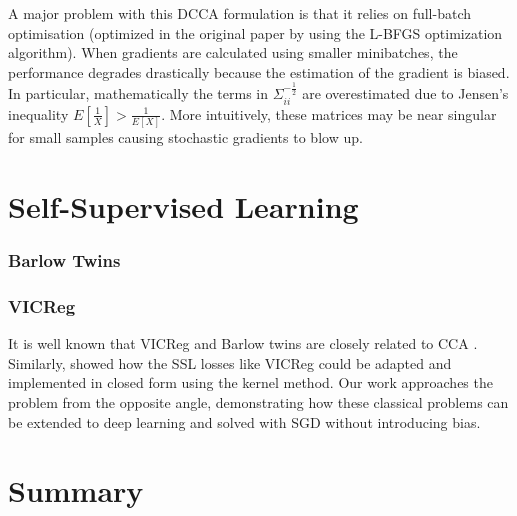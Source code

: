 A major problem with this DCCA formulation is that it relies on full-batch optimisation (optimized in the original paper by using the L-BFGS optimization algorithm). When gradients are calculated using smaller minibatches, the performance degrades drastically  because the estimation of the gradient is biased. In particular, mathematically the terms in $\Sigma_{ii}^{-\frac{1}{2}}$ are overestimated due to Jensen's inequality $E[\frac{1}{X}]>\frac{1}{E[X]}$. More intuitively, these matrices may be near singular for small samples causing stochastic gradients to blow up.

\section{Self-Supervised Learning}
\subsubsection{Barlow Twins}

\subsubsection{VICReg}


It is well known that VICReg and Barlow twins are closely related to CCA \cite{balestriero2022contrastive}. Similarly, \cite{kiani2022joint} showed how the SSL losses like VICReg could be adapted and implemented in closed form using the kernel method. Our work approaches the problem from the opposite angle, demonstrating how these classical problems can be extended to deep learning and solved with SGD without introducing bias.

\section{Summary}